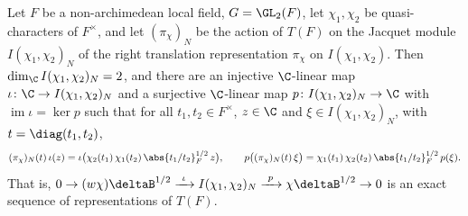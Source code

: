 Let $F$ be a non-archimedean local field, $G=\GL_2(F)$, let $\chi_1,\chi_2$ be quasi-characters of $F^\times$, and let
$(\pi_\chi)_N$ be the action of $T(F)$ on the Jacquet module $I(\chi_1,\chi_2)_N$ of the right translation
representation $\pi_\chi$ on $I(\chi_1,\chi_2)$. Then $\dim_\C I(\chi_1,\chi_2)_N=2$, and there are an injective
$\C$-linear map $\iota\colon\C\to I(\chi_1,\chi_2)_N$ and a surjective $\C$-linear map $p\colon I(\chi_1,\chi_2)_N\to\C$
with $\operatorname{im}\iota=\ker p$ such that for all $t_1,t_2\in F^\times$, $z\in\C$ and $\xi\in I(\chi_1,\chi_2)_N$,
with $t=\diag(t_1,t_2)$,
\[
  (\pi_\chi)_N(t)\,\iota(z)=\iota\bigl(\chi_2(t_1)\,\chi_1(t_2)\,\abs{t_1/t_2}_F^{1/2}\,z\bigr),\qquad
  p\bigl((\pi_\chi)_N(t)\,\xi\bigr)=\chi_1(t_1)\,\chi_2(t_2)\,\abs{t_1/t_2}_F^{1/2}\,p(\xi).
\]
That is, $0\to(w\chi)\deltaB^{1/2}\xrightarrow{\ \iota\ }I(\chi_1,\chi_2)_N\xrightarrow{\ p\ }\chi\deltaB^{1/2}\to0$ is an
exact sequence of representations of $T(F)$.
